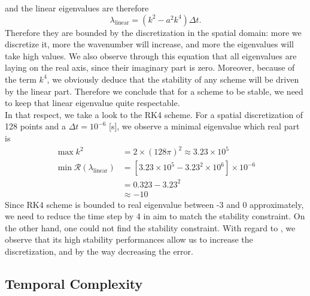 \documentclass[10pt,a4paper,twocolumn]{article}
\begin{document}
and the linear eigenvalues are therefore
\begin{equation}
	\lambda_{\text{linear}} = \left( k^2 - a^2 k^4 \right) \Delta t.
\end{equation}
Therefore they are bounded by the discretization in the spatial domain: more we discretize it, more the wavenumber will increase, and more the eigenvalues will take high values. We also observe through this equation that all eigenvalues are laying on the real axis, since their imaginary part is zero. Moreover, because of the term $k^4$, we obviously deduce that the stability of any scheme will be driven by the linear part. Therefore we conclude that for a scheme to be stable, we need to keep that linear eigenvalue quite respectable.
\vspace{\baselineskip}\\
In that respect, we take a look to the RK4 scheme. For a spatial discretization of 128 points and a $\Delta t = 10^{-6}$ [s], we observe a minimal eigenvalue which real part is
\begin{align*}
	\max k^2 &= 2\times(128\pi)^2 \approx 3.23\times10^5 \\
	\min \mathcal R (\lambda_\text{linear}) &= \left[ 3.23\times10^5 - 3.23^2\times10^6 \right]\times10^{-6} \\
	&= 0.323 - 3.23^2 \\
	&\approx -10
\end{align*}
Since RK4 scheme is bounded to real eigenvalue between -3 and 0 approximately, we need to reduce the time step by 4 in aim to match the stability constraint. On the other hand, one could not find the stability constraint. With regard to , we observe that its high stability performances allow us to increase the discretization, and by the way decreasing the error.

\subsection{Temporal Complexity} %
\label{sub:temporal_complexity}
\end{document}
